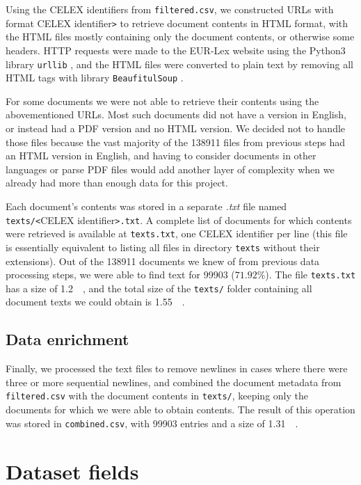 \documentclass[sigconf, authorversion]{acmart}
\begin{document}
Using the CELEX identifiers from \texttt{filtered.csv}, we constructed URLs with format CELEX identifier\texttt{>} to retrieve document contents in HTML format, with the HTML files mostly containing only the document contents, or otherwise some headers. HTTP requests were made to the EUR-Lex website using the Python3 library \texttt{urllib} \cite{urllib}, and the HTML files were converted to plain text by removing all HTML tags with library \texttt{BeaufitulSoup} \cite{beautifulsoup}.

For some documents we were not able to retrieve their contents using the abovementioned URLs. Most such documents did not have a version in English, or instead had a PDF version and no  HTML version. We decided not to handle those files because the vast majority of the \SI{138911}{} files from previous steps had an HTML version in English, and having to consider documents in other languages or parse PDF files would add another layer of complexity when we already had more than enough data for this project.

Each document's contents was stored in a separate \textit{.txt} file named \texttt{texts/<}CELEX identifier\texttt{>.txt}. A complete list of documents for which contents were retrieved is available at \texttt{texts.txt}, one CELEX identifier per line (this file is essentially equivalent to listing all files in directory \texttt{texts} without their extensions). Out of the \SI{138911}{} documents we knew of from previous data processing steps, we were able to find text for \SI{99903}{} ($71.92\%$). The file \texttt{texts.txt} has a size of \SI{1.2}{\mega\byte}, and the total size of the \texttt{texts/} folder containing all document texts we could obtain is \SI{1.55}{\giga\byte}.

\subsection{Data enrichment}

Finally, we processed the text files to remove newlines in cases where there were three or more sequential newlines, and combined the document metadata from \texttt{filtered.csv} with the document contents in \texttt{texts/}, keeping only the documents for which we were able to obtain contents. The result of this operation was stored in \texttt{combined.csv}, with \SI{99903}{} entries and a size of \SI{1.31}{\giga\byte}.

\section{Dataset fields}
\label{sec:dataset-fields}
\end{document}
